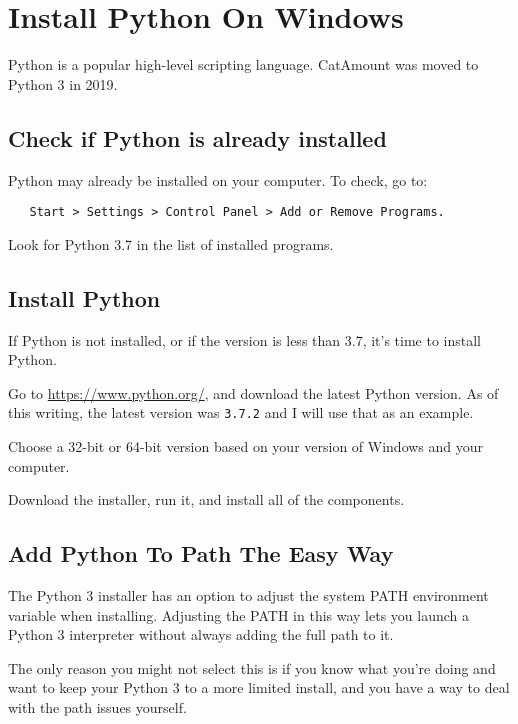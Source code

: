\chapter{Install Python On Windows}
\hypertarget{windows-install-python}{}

Python is a popular high-level scripting language. CatAmount was
moved to Python 3 in 2019.

\section{Check if Python is already installed}

Python may already be installed on your computer. To check, go
to:

\begin{verbatim}
   Start > Settings > Control Panel > Add or Remove Programs.
\end{verbatim}

Look for Python 3.7 in the list of installed programs.


\section{Install Python}

If Python is not installed, or if the version is less than 3.7,
it's time to install Python.

Go to \url{https://www.python.org/}, and download the latest
Python version. As of this writing, the latest version was \texttt{3.7.2}
and I will use that as an example.

Choose a 32-bit or 64-bit version based on your version of Windows
and your computer.

Download the installer, run it, and install all of the components.


\section{Add Python To Path The Easy Way}

The Python 3 installer has an option to adjust the system PATH
environment variable when installing. Adjusting the PATH in this
way lets you launch a Python 3 interpreter without always adding
the full path to it.

The only reason you might not select this is if you know what
you're doing and want to keep your Python 3 to a more limited install,
and you have a way to deal with the path issues yourself.


